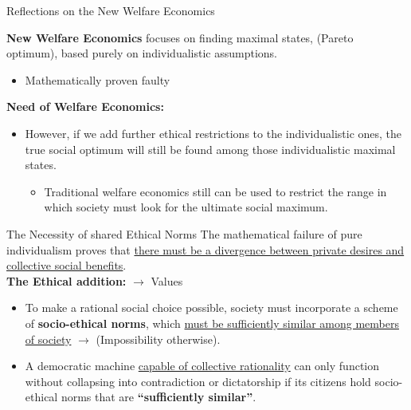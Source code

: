 \documentclass{beamer}
\begin{document}
\begin{frame}{Reflections on the New Welfare Economics}

    \textbf{New Welfare Economics} focuses on finding maximal states, (Pareto optimum), based purely on individualistic assumptions.
    \begin{itemize}
        \item[$\Rightarrow$] Mathematically proven faulty
    \end{itemize}
    \vspace{0.5 cm}
    \textbf{Need of Welfare Economics:} 
    \begin{itemize}
        \item However, if we add further ethical restrictions to the individualistic ones, the true social optimum will still be found among those individualistic maximal states.
        \begin{itemize}
            \item[$\Rightarrow$] Traditional welfare economics still can be used to restrict the range in which society must look for the ultimate social maximum.
        \end{itemize}
    \end{itemize}     
\end{frame}

\begin{frame}{The Necessity of shared Ethical Norms}
    The mathematical failure of pure individualism proves that \uline{there must be a divergence between private desires and collective social benefits}.\\
    \vspace{0.5 cm}
    \textbf{The Ethical addition:} $\rightarrow$ Values
    \begin{itemize}
        \item To make a rational social choice possible, society must incorporate a scheme of \textbf{socio-ethical norms}, which \uline{must be sufficiently similar among members of society} $\rightarrow$ (Impossibility otherwise). 
        \vspace{0.25 cm}
        \item[$\Rightarrow$] A democratic machine \uline{capable of collective rationality} can only function without collapsing into contradiction or dictatorship if its citizens hold socio-ethical norms that are \textbf{``sufficiently similar''}.  
    \end{itemize}
\end{frame}
\end{document}
